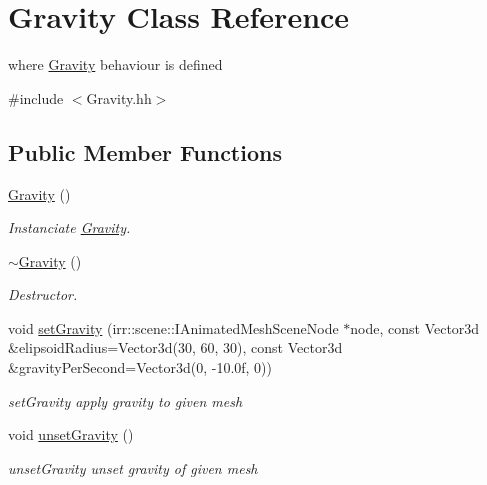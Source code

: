 \hypertarget{classGravity}{}\section{Gravity Class Reference}
\label{classGravity}


where \hyperlink{classGravity}{Gravity} behaviour is defined  




{\ttfamily \#include $<$Gravity.\+hh$>$}

\subsection*{Public Member Functions}
\begin{DoxyCompactItemize}
\item 
\mbox{\label{classGravity_ae971708aa344811adcc352e2d8a707de}} 
\hyperlink{classGravity_ae971708aa344811adcc352e2d8a707de}{Gravity} ()
\begin{DoxyCompactList}\small\item\em Instanciate \hyperlink{classGravity}{Gravity}. \end{DoxyCompactList}\item 
\mbox{\label{classGravity_a6fcaf5f5f0d4672c4a1d97a3102e053a}} 
\hyperlink{classGravity_a6fcaf5f5f0d4672c4a1d97a3102e053a}{$\sim$\+Gravity} ()
\begin{DoxyCompactList}\small\item\em Destructor. \end{DoxyCompactList}\item 
void \hyperlink{classGravity_ad908c8b212d4239cfb504560f5e24fd6}{set\+Gravity} (irr\+::scene\+::\+I\+Animated\+Mesh\+Scene\+Node $\ast$node, const Vector3d \&elipsoid\+Radius=Vector3d(30, 60, 30), const Vector3d \&gravity\+Per\+Second=Vector3d(0, -\/10.\+0f, 0))
\begin{DoxyCompactList}\small\item\em set\+Gravity apply gravity to given mesh \end{DoxyCompactList}\item 
\mbox{\label{classGravity_a2e27a01c3edd1a5d8aa580dced3c92b8}} 
void \hyperlink{classGravity_a2e27a01c3edd1a5d8aa580dced3c92b8}{unset\+Gravity} ()
\begin{DoxyCompactList}\small\item\em unset\+Gravity unset gravity of given mesh \end{DoxyCompactList}\end{DoxyCompactItemize}


